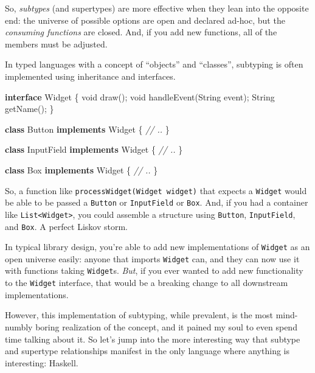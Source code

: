 \documentclass[]{article}
\newenvironment{Shaded}{}{}
\newcommand{\BuiltInTok}[1]{\textcolor[rgb]{0.00,0.50,0.00}{#1}}
\newcommand{\CommentTok}[1]{\textcolor[rgb]{0.38,0.63,0.69}{\textit{#1}}}
\newcommand{\DataTypeTok}[1]{\textcolor[rgb]{0.56,0.13,0.00}{#1}}
\newcommand{\FunctionTok}[1]{\textcolor[rgb]{0.02,0.16,0.49}{#1}}
\newcommand{\KeywordTok}[1]{\textcolor[rgb]{0.00,0.44,0.13}{\textbf{#1}}}
\newcommand{\NormalTok}[1]{#1}
\newcommand{\OperatorTok}[1]{\textcolor[rgb]{0.40,0.40,0.40}{#1}}
\begin{document}
So, \emph{subtypes} (and supertypes) are more effective when they lean into the
opposite end: the universe of possible options are open and declared ad-hoc, but
the \emph{consuming functions} are closed. And, if you add new functions, all of
the members must be adjusted.

In typed languages with a concept of ``objects'' and ``classes'', subtyping is
often implemented using inheritance and interfaces.

\begin{Shaded}
\begin{Highlighting}[]
\KeywordTok{interface}\NormalTok{ Widget }\OperatorTok{\{}
    \DataTypeTok{void} \FunctionTok{draw}\OperatorTok{();}
    \DataTypeTok{void} \FunctionTok{handleEvent}\OperatorTok{(}\BuiltInTok{String}\NormalTok{ event}\OperatorTok{);}
    \BuiltInTok{String} \FunctionTok{getName}\OperatorTok{();}
\OperatorTok{\}}

\KeywordTok{class} \BuiltInTok{Button} \KeywordTok{implements}\NormalTok{ Widget }\OperatorTok{\{}
    \CommentTok{// ..}
\OperatorTok{\}}

\KeywordTok{class}\NormalTok{ InputField }\KeywordTok{implements}\NormalTok{ Widget }\OperatorTok{\{}
    \CommentTok{// ..}
\OperatorTok{\}}

\KeywordTok{class} \BuiltInTok{Box} \KeywordTok{implements}\NormalTok{ Widget }\OperatorTok{\{}
    \CommentTok{// ..}
\OperatorTok{\}}
\end{Highlighting}
\end{Shaded}

So, a function like \texttt{processWidget(Widget\ widget)} that expects a
\texttt{Widget} would be able to be passed a \texttt{Button} or
\texttt{InputField} or \texttt{Box}. And, if you had a container like
\texttt{List\textless{}Widget\textgreater{}}, you could assemble a structure
using \texttt{Button}, \texttt{InputField}, and \texttt{Box}. A perfect Liskov
storm.

In typical library design, you're able to add new implementations of
\texttt{Widget} as an open universe easily: anyone that imports \texttt{Widget}
can, and they can now use it with functions taking \texttt{Widget}s. \emph{But},
if you ever wanted to add new functionality to the \texttt{Widget} interface,
that would be a breaking change to all downstream implementations.

However, this implementation of subtyping, while prevalent, is the most
mind-numbly boring realization of the concept, and it pained my soul to even
spend time talking about it. So let's jump into the more interesting way that
subtype and supertype relationships manifest in the only language where anything
is interesting: Haskell.
\end{document}

